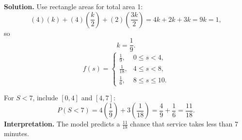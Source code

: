 \begin{ExamProblems}
		\textbf{Solution.}
		Use rectangle areas for total area 1:
		\[
		(4)(k)+(4)\left(\frac{k}{2}\right)+(2)\left(\frac{3k}{2}\right)
		=4k+2k+3k=9k=1,
		\]
		so
		\[
		k=\frac{1}{9}.
		\]
		\[
		f(s)=\begin{cases}
		\frac{1}{9}, & 0\le s<4,\\
		\frac{1}{18}, & 4\le s<8,\\
		\frac{1}{6}, & 8\le s\le 10.
		\end{cases}
		\]
		\begin{center}
		\end{center}
		For $S<7$, include $[0,4]$ and $[4,7]$:
		\[
		P(S<7)=4\left(\frac{1}{9}\right)+3\left(\frac{1}{18}\right)
		=\frac{4}{9}+\frac{1}{6}=\frac{11}{18}.
		\]
		\textbf{Interpretation.} The model predicts a $\frac{11}{18}$ chance that service takes less than 7 minutes.
		
	\end{ExamProblems}
	

